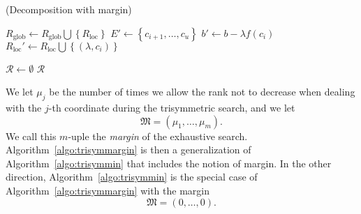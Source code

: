 \begin{algorithm}
  \caption{(Decomposition with margin)}\label{algo:decompmargin}
  \begin{algorithmic}[1]

    \State $R_\text{glob}\gets R_\text{glob}\bigcup\left\{R_\text{loc}\right\}$
    \State {}
   \Else
   \State $E'\gets\left\{ c_{i+1}, \dots, c_u \right\}$
    \State $b'\gets b-\lambda f(c_i)$
    \State $R_\text{loc}'\gets R_\text{loc}\bigcup\left\{ (\lambda, c_i)
    \right\}$
    \State {}
    \Else
    \State {}
    \EndIf
    \EndFor
    \EndFor
    \EndIf
    \EndIf
    \EndProcedure

    \State $\mathcal R\gets\emptyset$
    \State {}
    \State \Return $\mathcal R$
  \end{algorithmic}
\end{algorithm}
We let $\mu_j$ be the number of times we allow the rank not to decrease when
dealing with the $j$-th coordinate during the trisymmetric search, and we let
\[
  \mathfrak M=(\mu_1, \dots, \mu_m).
\]
We call this $m$-uple the \emph{margin} of the exhaustive search.
Algorithm~\ref{algo:trisymmargin} is then a generalization of
Algorithm~\ref{algo:trisymmin} that includes the notion of margin. In the other
direction, Algorithm~\ref{algo:trisymmin} is the special case of
Algorithm~\ref{algo:trisymmargin} with the margin
\[
  \mathfrak M = (0, \dots, 0).
\]
